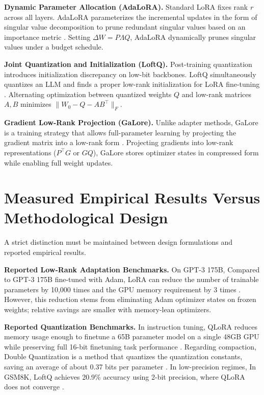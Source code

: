 \documentclass[11pt,a4paper]{article}
\begin{document}
\textbf{Dynamic Parameter Allocation (AdaLoRA).} Standard LoRA fixes rank $r$ across all layers. AdaLoRA parameterizes the incremental updates in the form of singular value decomposition to prune redundant singular values based on an importance metric \cite{zhang2023adalora}. Setting $\Delta W = P \Lambda Q$, AdaLoRA dynamically prunes singular values under a budget schedule.

\textbf{Joint Quantization and Initialization (LoftQ).} Post-training quantization introduces initialization discrepancy on low-bit backbones. LoftQ simultaneously quantizes an LLM and finds a proper low-rank initialization for LoRA fine-tuning \cite{li2023loftq}. Alternating optimization between quantized weights $Q$ and low-rank matrices $A, B$ minimizes $\|W_0 - Q - AB^\top\|_F$.

\textbf{Gradient Low-Rank Projection (GaLore).} Unlike adapter methods, GaLore is a training strategy that allows full-parameter learning by projecting the gradient matrix into a low-rank form \cite{zhao2024galore}. Projecting gradients into low-rank representations ($P^\top G$ or $G Q$), GaLore stores optimizer states in compressed form while enabling full weight updates.

\section{Measured Empirical Results Versus Methodological Design}

A strict distinction must be maintained between design formulations and reported empirical results.

\textbf{Reported Low-Rank Adaptation Benchmarks.} On GPT-3 175B, Compared to GPT-3 175B fine-tuned with Adam, LoRA can reduce the number of trainable parameters by 10,000 times and the GPU memory requirement by 3 times \cite{hu2021lora}. However, this reduction stems from eliminating Adam optimizer states on frozen weights; relative savings are smaller with memory-lean optimizers.

\textbf{Reported Quantization Benchmarks.} In instruction tuning, QLoRA reduces memory usage enough to finetune a 65B parameter model on a single 48GB GPU while preserving full 16-bit finetuning task performance \cite{dettmers2023qlora}. Regarding compaction, Double Quantization is a method that quantizes the quantization constants, saving an average of about 0.37 bits per parameter \cite{dettmers2023qlora}. In low-precision regimes, In GSM8K, LoftQ achieves 20.9\% accuracy using 2-bit precision, where QLoRA does not converge \cite{li2023loftq}.
\end{document}
